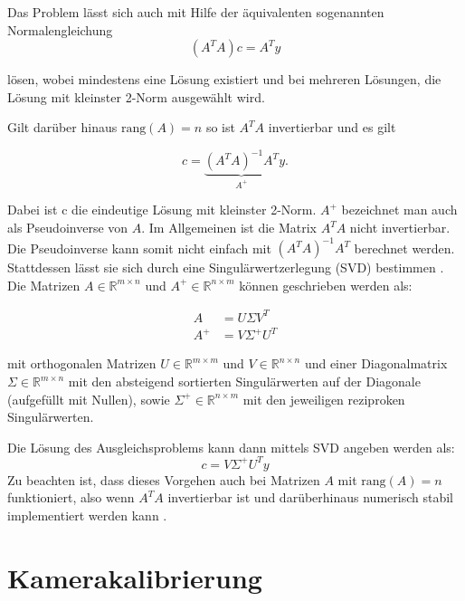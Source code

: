 Das Problem lässt sich auch mit Hilfe der äquivalenten sogenannten Normalengleichung
\begin{equation*}
	(A^TA)c = A^Ty
\end{equation*}

lösen, wobei mindestens eine Lösung existiert und bei mehreren Lösungen, die Lösung mit kleinster 2-Norm ausgewählt wird.

Gilt darüber hinaus $\text{rang}\left(A\right) = n$ so ist $A^TA$ invertierbar und es gilt

\begin{equation}\label{eq:normaleq}
c = \underbrace{(A^TA)^{-1}A^T}_{A^+}y.
\end{equation}

Dabei ist c die eindeutige Lösung mit kleinster 2-Norm. $A^+$ bezeichnet man auch als Pseudoinverse von $A$. Im Allgemeinen ist die Matrix $A^TA$ nicht invertierbar. Die Pseudoinverse kann somit nicht einfach mit $(A^TA)^{-1}A^T$ berechnet werden. Stattdessen lässt sie sich durch eine Singulärwertzerlegung (SVD) bestimmen \cite{Stoer2011}. Die Matrizen $A\in\mathbb{R}^{m\times n}$ und $A^+\in\mathbb{R}^{n\times m}$ können geschrieben werden als:

\[
\begin{aligned}
A &= U\Sigma V^T \\
A^+ &= V\Sigma^+U^T
\end{aligned}
\]

mit orthogonalen Matrizen $U\in\mathbb{R}^{m\times m}$ und $V\in\mathbb{R}^{n\times n}$ und einer Diagonalmatrix $\Sigma\in\mathbb{R}^{m\times n}$ mit den absteigend sortierten Singulärwerten auf der Diagonale (aufgefüllt mit Nullen), sowie $\Sigma^+\in\mathbb{R}^{n\times m}$ mit den jeweiligen reziproken Singulärwerten.


Die Lösung des Ausgleichsproblems kann dann mittels SVD angeben werden als:
\[
c = V\Sigma^+U^Ty
\]
Zu beachten ist, dass dieses Vorgehen auch bei Matrizen $A$ mit $\text{rang}\left(A\right) = n$ funktioniert, also wenn $A^TA$ invertierbar ist und darüberhinaus numerisch stabil implementiert werden kann \cite{Stoer2011}.



\section{Kamerakalibrierung}
\label{s:calib}

